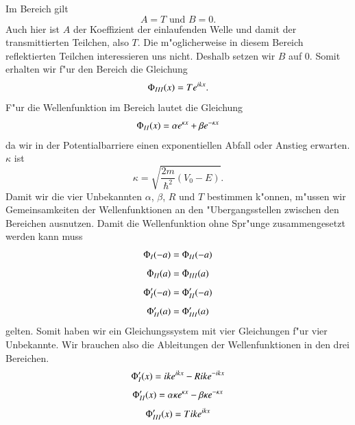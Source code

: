 \begin{refsection}
Im Bereich  gilt
\[
A = T \text{ und } B = 0.
\]
Auch hier ist $A$ der Koeffizient der einlaufenden Welle und damit der transmittierten Teilchen, also $T$. Die m"oglicherweise in diesem Bereich reflektierten Teilchen interessieren uns nicht. Deshalb setzen wir $B$ auf 0. Somit erhalten wir f"ur den Bereich  die Gleichung
\[
\Phi_\RM{3}(x) = Te^{ikx}.
\]
F"ur die Wellenfunktion im Bereich  lautet die Gleichung
\[
\Phi_\RM{2}(x) = \alpha e^{\kappa x} + \beta e^{-\kappa x}
\]
da wir in der Potentialbarriere einen exponentiellen Abfall oder Anstieg erwarten. $\kappa$ ist
\[
\kappa = \sqrt{\frac{2m}{\hbar^2}(V_0 - E)}.
\]
Damit wir die vier Unbekannten $\alpha$, $\beta$, $R$ und $T$ bestimmen k"onnen, m"ussen wir Gemeinsamkeiten der Wellenfunktionen an den "Ubergangsstellen zwischen den Bereichen ausnutzen. Damit die Wellenfunktion ohne Spr"unge zusammengesetzt werden kann muss
\[
\Phi_\RM{1}(-a) = \Phi_\RM{2}(-a)
\]
\[
\Phi_\RM{2}(a) = \Phi_\RM{3}(a)
\]
\[
\Phi_\RM{1}'(-a) = \Phi_\RM{2}'(-a)
\]
\[
\Phi_\RM{2}'(a) = \Phi_\RM{3}'(a)
\]
gelten. Somit haben wir ein Gleichungssystem mit vier Gleichungen f"ur vier Unbekannte. Wir brauchen also die Ableitungen der Wellenfunktionen in den drei Bereichen.
\[
\Phi_\RM{1}'(x) = ike^{ikx} - Rike^{-ikx}
\]
\[
\Phi_\RM{2}'(x) = \alpha \kappa e^{\kappa x} - \beta \kappa e^{-\kappa x}
\]
\[
\Phi_\RM{3}'(x) = Tike^{ikx}
\]






\printbibliography[heading=subbibliography]
\end{refsection}

